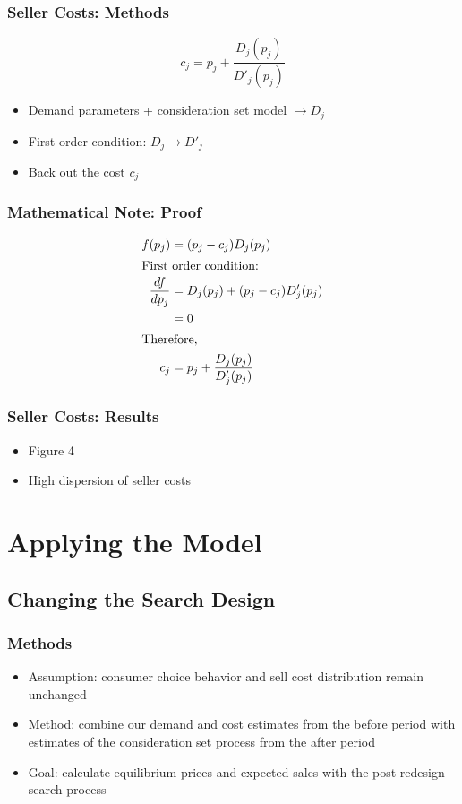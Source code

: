 \documentclass{beamer}
\begin{document}
\begin{frame}
\frametitle{Seller Costs: Methods}
$$
c_j = p_j +\frac{D_j(p_j)}{D'_j(p_j)}
$$
\begin{itemize}
\item Demand parameters + consideration set model $\to D_j$
\item First order condition: $D_j \to D'_j$
\item Back out the cost $c_j$
\end{itemize}
\end{frame}

\begin{frame}
\frametitle{Mathematical Note: Proof}
\begin{align*}
f(p_j)&=(p_j-c_j)D_j(p_j) \\
\intertext{First order condition:}
\frac{d f}{d p_j} &= D_j(p_j)+ (p_j-c_j)D'_j(p_j)  \\
&= 0 \\
\intertext{Therefore,}
c_j &= p_j +\frac{D_j(p_j)}{D'_j(p_j)} \\
\end{align*}
\end{frame}

\begin{frame}
\frametitle{Seller Costs: Results}
\begin{itemize}
\item Figure 4
\item High dispersion of seller costs
\end{itemize}
\end{frame}

\section{Applying the Model}
\subsection{Changing the Search Design}
\begin{frame}
\frametitle{Methods}
\begin{itemize}
\item Assumption: consumer choice behavior and sell cost distribution remain unchanged
\item Method: combine our demand and cost estimates from the before period with estimates of the consideration set process from the after period
\item Goal: calculate equilibrium prices and expected sales with the post-redesign search process
\end{itemize}
\end{frame}
\end{document}
